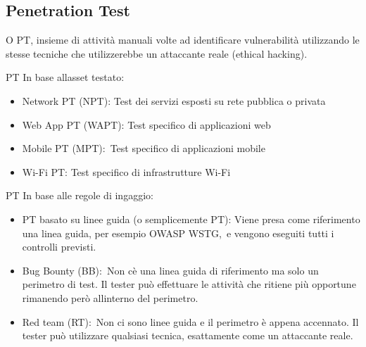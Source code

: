 \documentclass[
]{article}
\providecommand{\tightlist}{%
  \setlength{\itemsep}{0pt}\setlength{\parskip}{0pt}}
\begin{document}
{}

\subsection{\texorpdfstring{{Penetration
Test}}{Penetration Test}}\label{h.bbd7xilqsj8z}

{O PT, insieme di attività manuali volte ad identificare vulnerabilità
utilizzando le stesse tecniche che utilizzerebbe un attaccante reale
(ethical hacking).}

{PT In base all\textquotesingle asset testato: }

\begin{itemize}
\tightlist
\item
  {Network PT (NPT)}{: Test dei servizi esposti su rete pubblica o
  privata }
\item
  {Web App PT (WAPT)}{: Test specifico di applicazioni web }
\item
  {Mobile PT }{(MPT):}{~Test specifico di applicazioni mobile }
\item
  {Wi-Fi PT}{: Test specifico di infrastrutture Wi-Fi}
\end{itemize}

{}

{PT In base alle regole di ingaggio: }

\begin{itemize}
\tightlist
\item
  {PT basato su linee guida (o semplicemente PT)}{: Viene presa come
  riferimento una linea guida, per esempio OWASP }{WSTG,}{~e vengono
  eseguiti tutti i controlli previsti. }
\end{itemize}

{}

\begin{itemize}
\tightlist
\item
  {Bug Bounty (BB):}{~Non c\textquotesingle è una linea guida di
  riferimento ma solo un perimetro di test. Il tester può effettuare le
  attività che ritiene più opportune rimanendo però
  all\textquotesingle interno del perimetro. }
\end{itemize}

{}

\begin{itemize}
\tightlist
\item
  {Red team (RT):}{~Non ci sono linee guida e il perimetro è appena
  accennato. Il tester può utilizzare qualsiasi tecnica, esattamente
  come un attaccante reale.}
\end{itemize}
\end{document}
